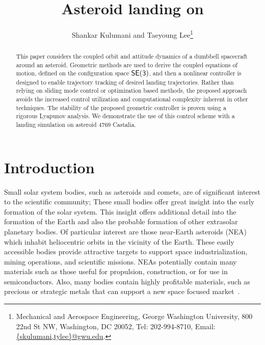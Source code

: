 \documentclass[letterpaper, paper,11pt]{AAS}		%
\begin{document}
\title{Asteroid landing on \SE}

\author{Shankar Kulumani and Taeyoung Lee\thanks{Mechanical and Aerospace Engineering, George Washington University, 800 22nd St NW, Washington, DC 20052, Tel: 202-994-8710, Email: \href{mailto:skulumani@gwu.edu}{\{skulumani,tylee\}@gwu.edu}.}
}


\maketitle{} 		

\begin{abstract}
    This paper considers the coupled orbit and attitude dynamics of a dumbbell spacecraft around an asteroid. 
    Geometric methods are used to derive the coupled equations of motion, defined on the configuration space \(\mathsf{SE(3)}\), and then a nonlinear controller is designed to enable trajectory tracking of desired landing trajectories.
    Rather than relying on sliding mode control or optimization based methods, the proposed approach avoids the increased control utilization and computational complexity inherent in other techniques.
    The stability of the proposed geometric controller is proven using a rigorous Lyapunov analysis.
    We demonstrate the use of this control scheme with a landing simulation on asteroid 4769 Castalia.
\end{abstract}

\section{Introduction}\label{sec:introduction}
Small solar system bodies, such as asteroids and comets, are of significant interest to the scientific community; These small bodies offer great insight into the early formation of the solar system.
This insight offers additional detail into the formation of the Earth and also the probable formation of other extrasolar planetary bodies.
Of particular interest are those near-Earth asteroids (NEA) which inhabit heliocentric orbits in the vicinity of the Earth.
These easily accessible bodies provide attractive targets to support space industrialization, mining operations, and scientific missions.
NEAs potentially contain many materials such as those useful for propulsion, construction, or for use in semiconductors.
Also, many bodies contain highly profitable materials, such as precious or strategic metals that can support a new space focused market~\cite{ross2001}.
\end{document}

